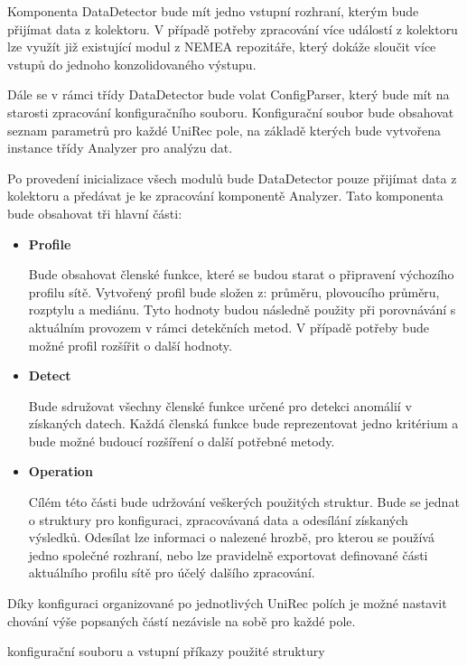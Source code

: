  Komponenta DataDetector bude mít jedno vstupní rozhraní, kterým bude přijímat data z kolektoru.
 V případě potřeby
 zpracování více událostí z kolektoru lze využít již existující modul z NEMEA repozitáře, který
 dokáže sloučit více vstupů do jednoho konzolidovaného výstupu. 
 
 Dále se v rámci třídy DataDetector bude volat ConfigParser, který bude mít na starosti zpracování 
 konfiguračního souboru. Konfigurační soubor bude obsahovat seznam parametrů pro každé UniRec pole,
 na základě kterých bude vytvořena instance třídy Analyzer pro analýzu dat. 
 
 Po provedení inicializace všech modulů bude DataDetector pouze přijímat data z kolektoru a 
 předávat je ke zpracování komponentě Analyzer. Tato komponenta bude obsahovat
 tři hlavní části:
 \begin{itemize}
  \item \textbf{Profile}
  
  Bude obsahovat členské funkce, které se budou starat o připravení výchozího profilu sítě. 
  Vytvořený profil bude složen z: průměru, plovoucího průměru, rozptylu a mediánu.
  Tyto hodnoty budou následně použity při porovnávání s aktuálním provozem v rámci detekčních
  metod. V případě potřeby bude možné profil rozšířit o další hodnoty.
  
  \item \textbf{Detect}
  
  Bude sdružovat všechny členské funkce určené pro detekci anomálií v získaných datech. 
  Každá členská funkce bude reprezentovat jedno kritérium a bude možné budoucí rozšíření o další
  potřebné metody.
  
  \item \textbf{Operation}
  
  Cílém této části bude udržování veškerých použitých struktur. Bude se jednat o struktury 
  pro konfiguraci, zpracovávaná data a odesílání získaných výsledků. Odesílat lze informaci o 
  nalezené hrozbě, pro kterou se používá jedno společné rozhraní, nebo lze pravidelně exportovat
  definované části aktuálního profilu sítě pro účelý dalšího zpracování. 
  
 \end{itemize}

 Díky konfiguraci organizované po jednotlivých UniRec polích je možné nastavit chování výše
 popsaných částí nezávisle na sobě pro každé pole.
 
 konfigurační souboru a vstupní příkazy
 použité struktury
  
